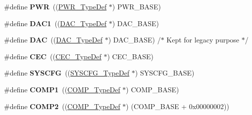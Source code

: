 \begin{DoxyCompactItemize}
\mbox{\label{group___peripheral__declaration_ga04651c526497822a859942b928e57f8e}} 
\#define {\bfseries P\+WR}~((\hyperlink{struct_p_w_r___type_def}{P\+W\+R\+\_\+\+Type\+Def} $\ast$) P\+W\+R\+\_\+\+B\+A\+SE)
\item 
\mbox{\label{group___peripheral__declaration_gaffb5ff8779fa698f3c7165a617d56e4f}} 
\#define {\bfseries D\+A\+C1}~((\hyperlink{struct_d_a_c___type_def}{D\+A\+C\+\_\+\+Type\+Def} $\ast$) D\+A\+C\+\_\+\+B\+A\+SE)
\item 
\mbox{\label{group___peripheral__declaration_ga4aa2a4ab86ce00c23035e5cee2e7fc7e}} 
\#define {\bfseries D\+AC}~((\hyperlink{struct_d_a_c___type_def}{D\+A\+C\+\_\+\+Type\+Def} $\ast$) D\+A\+C\+\_\+\+B\+A\+SE) /$\ast$ Kept for legacy purpose $\ast$/
\item 
\mbox{\label{group___peripheral__declaration_ga7d03f4d873d59ff8bc76b6c9b576f3e3}} 
\#define {\bfseries C\+EC}~((\hyperlink{struct_c_e_c___type_def}{C\+E\+C\+\_\+\+Type\+Def} $\ast$) C\+E\+C\+\_\+\+B\+A\+SE)
\item 
\mbox{\label{group___peripheral__declaration_ga3c833fe1c486cb62250ccbca32899cb8}} 
\#define {\bfseries S\+Y\+S\+C\+FG}~((\hyperlink{struct_s_y_s_c_f_g___type_def}{S\+Y\+S\+C\+F\+G\+\_\+\+Type\+Def} $\ast$) S\+Y\+S\+C\+F\+G\+\_\+\+B\+A\+SE)
\item 
\mbox{\label{group___peripheral__declaration_gaf5713f83009027d48805b049d55bb01b}} 
\#define {\bfseries C\+O\+M\+P1}~((\hyperlink{struct_c_o_m_p___type_def}{C\+O\+M\+P\+\_\+\+Type\+Def} $\ast$) C\+O\+M\+P\+\_\+\+B\+A\+SE)
\item 
\mbox{\label{group___peripheral__declaration_ga6985fa7e9bb3c2edf15b29b7af210a2b}} 
\#define {\bfseries C\+O\+M\+P2}~((\hyperlink{struct_c_o_m_p___type_def}{C\+O\+M\+P\+\_\+\+Type\+Def} $\ast$) (C\+O\+M\+P\+\_\+\+B\+A\+SE + 0x00000002))
\item 
\mbox{\label{group___peripheral__declaration_ga7c0dbc759386dc94597d1ab7b798e75f}} 

\end{DoxyCompactItemize}
